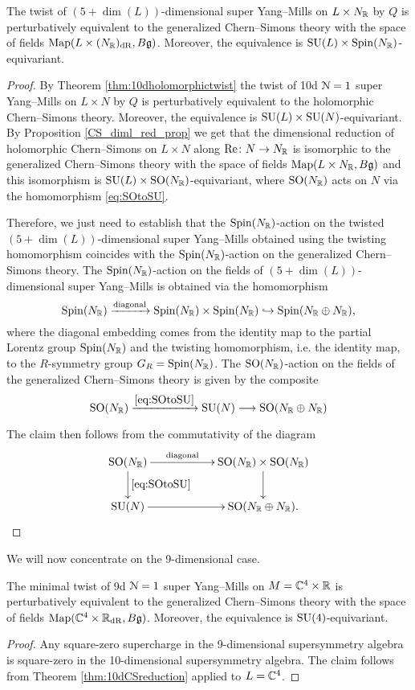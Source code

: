 \documentclass[10pt, oneside]{article}
\renewcommand{\Re}{\mathrm{Re}}
\begin{document}
\begin{thm}
The twist of $(5+\dim(L))$-dimensional super Yang--Mills on $L\times N_\mathbb R$ by $Q$ is perturbatively equivalent to the generalized Chern--Simons theory with the space of fields $\operatorname{Map}(L\times (N_\mathbb R)_{\mathrm{dR}}, B\mathfrak g)$. Moreover, the equivalence is $\mathrm{SU}(L)\times \mathrm{Spin}(N_\mathbb R)$-equivariant.
\label{thm:10dCSreduction}
\end{thm}
\begin{proof}
By Theorem \ref{thm:10dholomorphictwist} the twist of 10d $\mathcal N=1$ super Yang--Mills on $L\times N$ by $Q$ is perturbatively equivalent to the holomorphic Chern--Simons theory. Moreover, the equivalence is $\mathrm{SU}(L)\times \mathrm{SU}(N)$-equivariant. By Proposition \ref{CS_diml_red_prop} we get that the dimensional reduction of holomorphic Chern--Simons on $L\times N$ along $\Re\colon N\rightarrow N_\RR$ is isomorphic to the generalized Chern--Simons theory with the space of fields $\operatorname{Map}(L\times N_\mathbb R, B\mathfrak g)$ and this isomorphism is $\mathrm{SU}(L)\times \mathrm{SO}(N_\mathbb R)$-equivariant, where $\mathrm{SO}(N_\mathbb R)$ acts on $N$ via the homomorphism \eqref{eq:SOtoSU}.

Therefore, we just need to establish that the $\mathrm{Spin}(N_\mathbb R)$-action on the twisted $(5+\dim(L))$-dimensional super Yang--Mills obtained using the twisting homomorphism coincides with the $\mathrm{Spin}(N_\mathbb R)$-action on the generalized Chern--Simons theory. The $\mathrm{Spin}(N_\mathbb R)$-action on the fields of $(5+\dim(L))$-dimensional super Yang--Mills is obtained via the homomorphism
\[\mathrm{Spin}(N_\mathbb R)\xrightarrow{\mathrm{diagonal}}\mathrm{Spin}(N_\mathbb R)\times \mathrm{Spin}(N_\mathbb R)\hookrightarrow \mathrm{Spin}(N_\mathbb R\oplus N_\mathbb R),\]
where the diagonal embedding comes from the identity map to the partial Lorentz group $\mathrm{Spin}(N_\mathbb R)$ and the twisting homomorphism, i.e. the identity map, to the $R$-symmetry group $G_R=\mathrm{Spin}(N_\mathbb R)$. The $\mathrm{SO}(N_\mathbb R)$-action on the fields of the generalized Chern--Simons theory is given by the composite
\[\mathrm{SO}(N_\mathbb R)\xrightarrow{\eqref{eq:SOtoSU}} \mathrm{SU}(N)\longrightarrow \mathrm{SO}(N_\mathbb R\oplus N_\mathbb R)\]

The claim then follows from the commutativity of the diagram
\[
\xymatrix@C=2cm{
\SO(N_\RR) \ar^-{\mathrm{diagonal}}[r] \ar^{\eqref{eq:SOtoSU}}[d] & \SO(N_\RR)\times \SO(N_\RR) \ar[d] \\
\SU(N) \ar[r] & \SO(N_\RR\oplus N_\RR).
}
\]
\end{proof}

We will now concentrate on the 9-dimensional case.

\begin{thm}
The minimal twist of 9d $\mathcal{N}=1$ super Yang--Mills on $M=\mathbb C^4\times \mathbb R$ is perturbatively equivalent to the generalized Chern--Simons theory with the space of fields $\operatorname{Map}(\mathbb C^4\times \mathbb R_{\mathrm{dR}}, B\mathfrak{g})$. Moreover, the equivalence is $\mathrm{SU}(4)$-equivariant.
\label{thm:9dminimaltwist}
\end{thm}
\begin{proof}
Any square-zero supercharge in the 9-dimensional supersymmetry algebra is square-zero in the 10-dimensional supersymmetry algebra. The claim follows from Theorem \ref{thm:10dCSreduction} applied to $L=\mathbb C^4$.
\end{proof}
\end{document}
